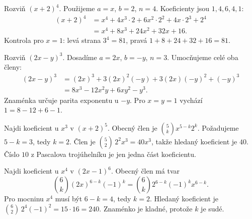 \documentclass[11pt,a4paper]{article}
\begin{document}


\begin{prikladReseniBox}[title={Příklad P1}]
Rozviň \((x+2)^4\).
\tcblower
Použijeme $a=x$, $b=2$, $n=4$. Koeficienty jsou $1,4,6,4,1$:
\begin{align*}
 (x+2)^4&=x^4+4x^3\cdot2+6x^2\cdot2^2+4x\cdot2^3+2^4\\
 &=x^4+8x^3+24x^2+32x+16.
\end{align*}
Kontrola pro $x=1$: levá strana $3^4=81$, pravá $1+8+24+32+16=81$.
\end{prikladReseniBox}


\begin{prikladReseniBox}[title={Příklad P2}]
Rozviň \((2x-y)^3\).
\tcblower
Dosadíme $a=2x$, $b=-y$, $n=3$. Umocňujeme celé oba členy:
\begin{align*}
 (2x-y)^3&=(2x)^3+3(2x)^2(-y)+3(2x)(-y)^2+(-y)^3\\
 &=8x^3-12x^2y+6xy^2-y^3.
\end{align*}
Znaménka určuje parita exponentu u $-y$. Pro $x=y=1$ vychází $1=8-12+6-1$.
\end{prikladReseniBox}


\begin{prikladReseniBox}[title={Příklad P3}]
Najdi koeficient u \(x^3\) v \((x+2)^5\).
\tcblower
Obecný člen je $\binom5k x^{5-k}2^k$. Požadujeme $5-k=3$, tedy $k=2$. Člen je $\binom52\,2^2x^3=40x^3$, takže hledaný koeficient je $40$. Číslo $10$ z Pascalova trojúhelníku je jen jedna část koeficientu.
\end{prikladReseniBox}


\begin{prikladReseniBox}[title={Příklad P4}]
Najdi koeficient u \(x^4\) v \((2x-1)^6\).
\tcblower
Obecný člen má tvar
\[
 \binom6k(2x)^{6-k}(-1)^k
 =\binom6k2^{6-k}(-1)^k x^{6-k}.
\]
Pro mocninu $x^4$ musí být $6-k=4$, tedy $k=2$. Hledaný koeficient je $\binom62\,2^4(-1)^2=15\cdot16=240$. Znaménko je kladné, protože $k$ je sudé.
\end{prikladReseniBox}
\end{document}
